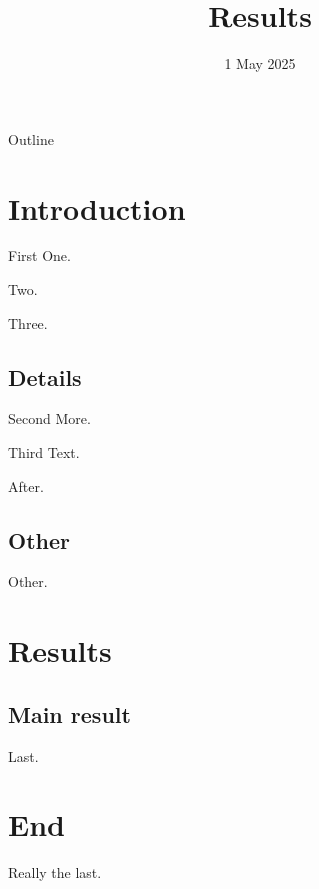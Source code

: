 \documentclass{beamer}
\title{Results}
\date{1 May 2025}
\begin{document}
\begin{frame}{Outline}
\tableofcontents
\end{frame}
\section{Introduction}
\begin{frame}{First}
One.

\pause
Two.

\pause
Three.
\end{frame}
\subsection{Details}
\begin{frame}{Second}
More.
\end{frame}
\begin{frame}{Third}
Text.

\pause
After.
\end{frame}
\subsection{Other}
\begin{frame}
Other.
\end{frame}
\section{Results}
\subsection{Main result}
\begin{frame}
Last.
\end{frame}
\section{End}
\begin{frame}
Really the last.
\end{frame}
\end{document}
